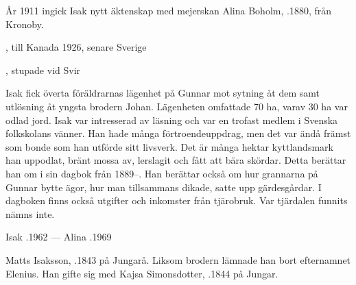 År 1911 ingick Isak nytt äktenskap med mejerskan Alina Boholm, .1880, från Kronoby.
\begin{jhchildren}
  \item {}, till Kanada 1926, senare Sverige
  \item {}
  \item {}
  \item {}
  \item {}, stupade vid Svir
  \item {}
\end{jhchildren}

Isak fick överta föräldrarnas lägenhet på Gunnar mot sytning åt dem samt utlösning åt yngsta brodern Johan. Lägenheten omfattade 70 ha, varav 30 ha var odlad jord. Isak var intresserad av läsning och var en trofast medlem i Svenska folkskolans vänner. Han hade många förtroendeuppdrag, men det var ändå främst som bonde som han utförde sitt livsverk. Det är många hektar kyttlandsmark han uppodlat, bränt mossa av, lerslagit och fått att bära skördar. Detta berättar han om i sin dagbok från 1889--. Han berättar också om  hur grannarna på Gunnar bytte ägor, hur man tillsammans dikade, satte upp gärdesgårdar. I dagboken finns också utgifter och inkomster från tjärobruk. Var tjärdalen funnits nämns	inte.

Isak .1962  ---  Alina .1969


Matts Isaksson, .1843 på Jungarå. Liksom brodern lämnade han bort efternamnet Elenius. Han gifte sig med Kajsa Simonsdotter,	.1844 på Jungar.
\begin{jhchildren}
  \item {}
  \item {}
  \item {}
  \item {}
  \item {}
  \item {}
  \item {}
  \item {}
\end{jhchildren}

